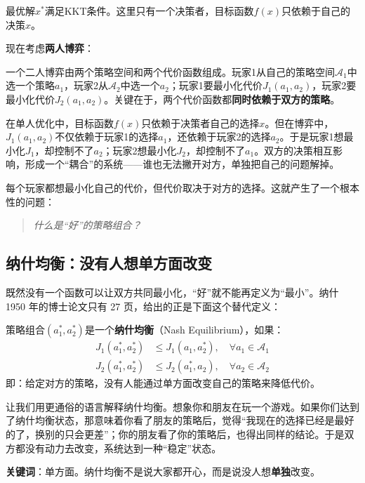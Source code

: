最优解$x^*$满足KKT条件。这里只有一个决策者，目标函数$f(x)$只依赖于自己的决策$x$。

现在考虑\textbf{两人博弈}：

\begin{definition}[二人博弈]
一个二人博弈由两个策略空间和两个代价函数组成。玩家1从自己的策略空间$\mathcal{A}_1$中选一个策略$a_1$，玩家2从$\mathcal{A}_2$中选一个$a_2$；玩家1要最小化代价$J_1(a_1, a_2)$，玩家2要最小化代价$J_2(a_1, a_2)$。关键在于，两个代价函数都\textbf{同时依赖于双方的策略}。
\end{definition}

\begin{remark}[与优化问题的关键区别]
在单人优化中，目标函数$f(x)$只依赖于决策者自己的选择$x$。但在博弈中，$J_1(a_1, a_2)$不仅依赖于玩家1的选择$a_1$，还依赖于玩家2的选择$a_2$。于是玩家1想最小化$J_1$，却控制不了$a_2$；玩家2想最小化$J_2$，却控制不了$a_1$。双方的决策相互影响，形成一个“耦合”的系统——谁也无法撇开对方，单独把自己的问题解掉。
\end{remark}

每个玩家都想最小化自己的代价，但代价取决于对方的选择。这就产生了一个根本性的问题：

\begin{quote}
\textit{什么是“好”的策略组合？}
\end{quote}

\subsection{纳什均衡：没有人想单方面改变}

既然没有一个函数可以让双方共同最小化，“好”就不能再定义为“最小”。纳什 1950 年的博士论文只有 27 页，给出的正是下面这个替代定义：

\begin{definition}[纳什均衡]
策略组合$(a_1^*, a_2^*)$是一个\textbf{纳什均衡}（Nash Equilibrium），如果：
\begin{align}
    J_1(a_1^*, a_2^*) &\leq J_1(a_1, a_2^*), \quad \forall a_1 \in \mathcal{A}_1 \\
    J_2(a_1^*, a_2^*) &\leq J_2(a_1^*, a_2), \quad \forall a_2 \in \mathcal{A}_2
\end{align}
即：给定对方的策略，没有人能通过单方面改变自己的策略来降低代价。
\end{definition}

\begin{remark}[纳什均衡的直观理解]
让我们用更通俗的语言解释纳什均衡。想象你和朋友在玩一个游戏。如果你们达到了纳什均衡状态，那意味着你看了朋友的策略后，觉得“我现在的选择已经是最好的了，换别的只会更差”；你的朋友看了你的策略后，也得出同样的结论。于是双方都没有动力去改变，系统达到一种“稳定”状态。

\textbf{关键词}：单方面。纳什均衡不是说大家都开心，而是说没人想\textbf{单独}改变。
\end{remark}

